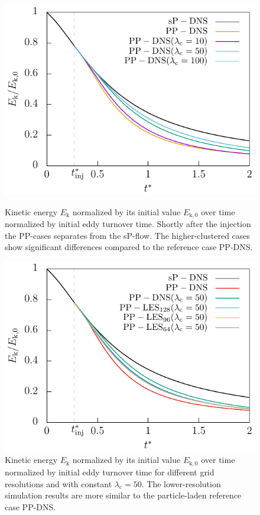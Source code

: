 \documentclass[11pt,a4paper,openany,oneside,parskip=half*]{article}
\begin{document}
\begin{figure}[]
    \centering
    \begin{minipage}[t]{0.5\textwidth}
        \centering
 	   \includegraphics[width=\linewidth]{./Abbildungen/256/kineticEnergy_time.pdf}
	   \caption{Kinetic energy $E_\mathrm{k}$ normalized by its initial value $E_\mathrm{k,0}$ over time normalized by initial eddy turnover time. Shortly after the injection the PP-cases separates from the sP-flow. The higher-clustered cases show significant differences compared to the reference case PP-DNS.}
	\label{kineticEnergy_time_256}
    \end{minipage}%
\begin{minipage}[t]{0.5\textwidth}
        \centering
        \includegraphics[width=\linewidth]{./Abbildungen/256/kineticEnergy_comp50.pdf}
        \caption{Kinetic energy $E_\mathrm{k}$ normalized by its initial value $E_\mathrm{k,0}$ over time normalized by initial eddy turnover time for different grid resolutions and with constant $\lambda_\mathrm{c}=50$. The lower-resolution simulation results are more similar to the particle-laden reference case PP-DNS.}
        \label{comparison_LES_DNS}
    \end{minipage}
\end{figure}
\end{document}

